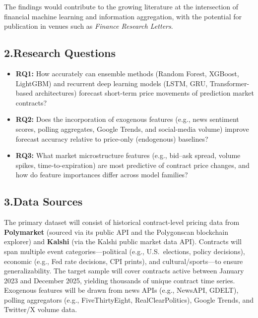 \documentclass[12pt]{article}
\begin{document}
The findings would contribute to the growing literature at the intersection of financial machine learning and information aggregation, with the potential for publication in venues such as \textit{Finance Research Letters}.

\subsection*{2.\quad Research Questions}

\begin{itemize}[leftmargin=2em]
  \item \textbf{RQ1:} How accurately can ensemble methods (Random Forest, XGBoost, LightGBM) and recurrent deep learning models (LSTM, GRU, Transformer-based architectures) forecast short-term price movements of prediction market contracts?
  \item \textbf{RQ2:} Does the incorporation of exogenous features (e.g., news sentiment scores, polling aggregates, Google Trends, and social-media volume) improve forecast accuracy relative to price-only (endogenous) baselines?
  \item \textbf{RQ3:} What market microstructure features (e.g., bid--ask spread, volume spikes, time-to-expiration) are most predictive of contract price changes, and how do feature importances differ across model families?
\end{itemize}

\subsection*{3.\quad Data Sources}

The primary dataset will consist of historical contract-level pricing data from \textbf{Polymarket} (sourced via its public API and the Polygonscan blockchain explorer) and \textbf{Kalshi} (via the Kalshi public market data API).
Contracts will span multiple event categories---political (e.g., U.S.\ elections, policy decisions), economic (e.g., Fed rate decisions, CPI prints), and cultural/sports---to ensure generalizability.
The target sample will cover contracts active between January 2023 and December 2025, yielding thousands of unique contract time series.
Exogenous features will be drawn from news APIs (e.g., NewsAPI, GDELT), polling aggregators (e.g., FiveThirtyEight, RealClearPolitics), Google Trends, and Twitter/X volume data.
\end{document}
